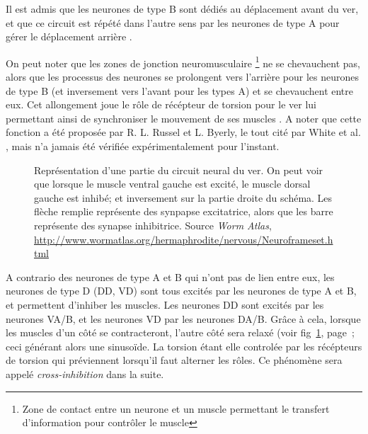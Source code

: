 Il est admis que les neurones de type B sont dédiés au déplacement avant du ver,
et que ce circuit est répété dans l'autre sens par les neurones de type A
pour gérer le déplacement arrière \cite{AltunZ.F.andHall2011,Boyle2009,White1986}.

On peut noter que les zones de jonction neuromusculaire \footnote{Zone de
contact entre un neurone et un muscle permettant le transfert d'information 
pour contrôler le muscle} ne se chevauchent pas, alors que les processus
des neurones se prolongent vers l'arrière pour les neurones de type B (et
inversement vers l'avant pour les types A) et se chevauchent entre eux. Cet
allongement joue le rôle de récépteur de torsion pour le ver lui permettant
ainsi de synchroniser le mouvement de ses muscles \cite{Boyle2009}. A noter que
cette fonction a été proposée par R. L. Russel et L. Byerly, le tout cité par
White et al. \cite{White1986}, mais n'a jamais été vérifiée expérimentalement
pour l'instant.


\begin{figure}[ht]
   \begin{center}
   \end{center}
   \caption{Représentation d'une partie du circuit neural du ver. On peut voir
   que lorsque le muscle ventral gauche est excité, le muscle dorsal gauche est
   inhibé; et inversement sur la partie droite du schéma. Les flèche remplie
   représente des synpapse excitatrice, alors que les barre représente des
   synapse inhibitrice. Source \textit{Worm Atlas},
   \url{http://www.wormatlas.org/hermaphrodite/nervous/Neuroframeset.html}}
   \label{fig:alternance_dv}
\end{figure}

A contrario des neurones de type A et B qui n'ont pas de lien entre eux, les
neurones de type D (DD, VD) sont tous excités par les neurones de type A et B,
et permettent d'inhiber les muscles. Les neurones DD sont excités par les
neurones VA/B, et les neurones VD par les neurones DA/B. Grâce à cela, lorsque
les muscles d'un côté se contracteront, l'autre côté sera relaxé (voir
fig~\ref{fig:alternance_dv}, page~\pageref{fig:alternance_dv}; ceci générant
alors une sinusoïde. La torsion étant elle controlée par les récépteurs de
torsion qui préviennent lorsqu'il faut alterner les rôles. Ce phénomène sera
appelé \textit{cross-inhibition} dans la suite.\\


